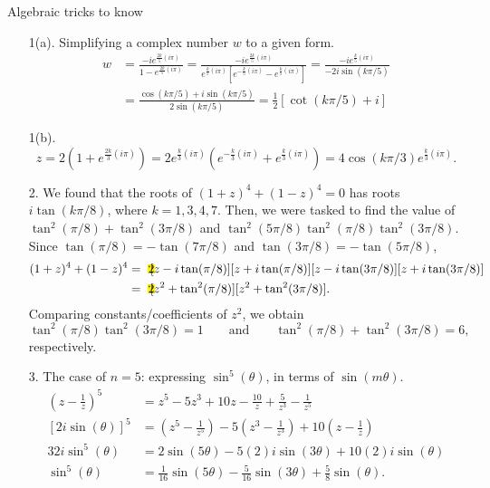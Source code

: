 \documentclass[oneside]{book}
\newcommand{\highlight}[2][red!50]{\mathpalette{\highlightwithstyle[#1]}{#2}}
\newcommand{\highlightwithstyle}[3][red!50]{
  \begingroup                         %
    \sbox0{$\mathsurround 0pt #2#3$}%
    \setlength{\fboxsep}{.5pt}        %
    \sbox2{\hspace{-.5pt}%
      \colorbox{#1}{\usebox0}%
    }%
    \dp2=\dp0 \ht2=\ht0 \wd2=\wd0     %
    \box2                             %
  \endgroup                           %
}
\begin{document}
\begin{example}{Algebraic tricks to know}{}
  \begin{enumerate}
    \item[1(a).] Simplifying a complex number \(w\) to a given form. 
    \begin{align*}
      w&=\frac{-ie^{\frac{2k}{5}(i\pi)}}{1-e^{\frac{2k}{5}(i\pi)}}=\frac{-ie^{\frac{2k}{5}(i\pi)}}{e^{\frac{k}{5}(i\pi)}\left[ e^{-\frac{k}{5}(i\pi)}-e^{\frac{k}{5}(i\pi)} \right]}=\frac{-ie^{\frac{k}{5}(i\pi)}}{-2i\sin(k\pi/5)}\\
      &=\frac{\cos(k\pi/5)+i\sin(k\pi/5)}{2\sin(k\pi/5)}=\frac{1}{2}[\cot(k\pi/5)+i]
    \end{align*}
    \item[1(b).]
    \[z=2\left( 1+e^{\frac{2k}{3}(i\pi)} \right)=2e^{\frac{k}{3}(i\pi)}\left( e^{-\frac{k}{3}(i\pi)}+e^{\frac{k}{3}(i\pi)} \right)=4\cos(k\pi/3)e^{\frac{k}{3}(i\pi)}.\]
    \item[2.] We found that the roots of \((1+z)^4+(1-z)^4=0\) has roots \(i\tan(k\pi/8)\), where \(k=1,3,4,7\). Then, we were tasked to find the value of \(\tan^2(\pi/8)+\tan^2(3\pi/8)\) and \(\tan^2(5\pi/8)\tan^2(\pi/8)\tan^2(3\pi/8)\).\\[\baselineskip]
    Since \(\tan(\pi/8)=-\tan(7\pi/8)\) and \(\tan(3\pi/8)=-\tan(5\pi/8)\),
    \begin{align*}
      (1+z)^4+(1-z)^4 &= \highlight[yellow]{2}[z-i\tan(\pi/8)][z+i\tan(\pi/8)][z-i\tan(3\pi/8)][z+i\tan(3\pi/8)]\\
      &= \highlight[yellow]{2}[z^2+\tan^2(\pi/8)][z^2+\tan^2(3\pi/8)].
    \end{align*}
    Comparing constants/coefficients of \(z^2\), we obtain 
    \[\tan^2(\pi/8)\tan^2(3\pi/8)=1 \qquad\text{and}\qquad \tan^2(\pi/8)+\tan^2(3\pi/8)=6,\]
    respectively.  
    \item[3.] The case of \(n=5\): expressing \(\sin^5(\theta)\), in terms of \(\sin(m\theta)\).
    \begin{align*}
      \left( z-\frac{1}{z} \right)^5 &= z^5-5z^3+10z-\frac{10}{z}+\frac{5}{z^3}-\frac{1}{z^5}\\
      [2i\sin(\theta)]^5 &= \left( z^5-\frac{1}{z^5} \right)-5\left( z^3-\frac{1}{z^3} \right)+10\left( z-\frac{1}{z} \right)\\
      32i\sin^5(\theta) &= 2\sin(5\theta)-5(2)i\sin(3\theta)+10(2)i\sin(\theta)\\
      \sin^5(\theta) &= \frac{1}{16}\sin(5\theta)-\frac{5}{16}\sin(3\theta)+\frac{5}{8}\sin(\theta).
    \end{align*}
  \end{enumerate}
\end{example}
\end{document}
